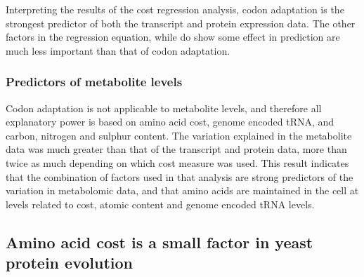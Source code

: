 Interpreting the results of the cost regression analysis, codon adaptation is the strongest predictor of both the transcript and protein expression data. The other factors in the regression equation, while do show some effect in prediction are much less important than that of codon adaptation.

\subsubsection{Predictors of metabolite levels}

Codon adaptation is not applicable to metabolite levels, and therefore all explanatory power is based on amino acid cost, genome encoded tRNA, and carbon, nitrogen and sulphur content. The variation explained in the metabolite data was much greater than that of the transcript and protein data, more than twice as much depending on which cost measure was used. This result indicates that the combination of factors used in that analysis are strong predictors of the variation in metabolomic data, and that amino acids are maintained in the cell at levels related to cost, atomic content and genome encoded tRNA levels.

\subsection{Amino acid cost is a small factor in yeast protein evolution}

